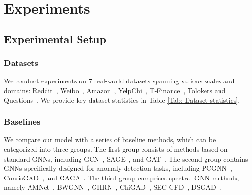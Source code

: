 \section{Experiments}

\subsection{Experimental Setup}
\subsubsection{Datasets}
We conduct experiments on 7 real-world datasets spanning various scales and domains: Reddit~\citep{RedWei}, Weibo~\citep{RedWei}, Amazon~\citep{Amazon}, YelpChi~\citep{YelpChi}, T-Finance~\citep{BWGNN}, Tolokers and Questions~\citep{TolQue}. 
We provide key dataset statistics in Table \ref{Tab: Dataset statistics}.
\begin{table}[t]
    \begin{center}
    {\caption{Key details of seven evaluation datasets }\label{Tab: Dataset statistics}}
    \end{center}
\end{table}
\subsubsection{Baselines}
We compare our model with a series of baseline methods, which can be categorized into three groups.
The first group consists of methods based on standard GNNs, including GCN~\citep{GCN}, SAGE~\citep{SAGE}, and GAT~\citep{GAT}. 
The second group contains GNNs specifically designed for anomaly detection tasks, including PCGNN~\citep{PCGNN}, ConsisGAD~\citep{ConsisGAD}, and GAGA~\citep{GAGA}.
The third group comprises spectral GNN methods, namely
AMNet~\citep{AMNet}, BWGNN~\citep{BWGNN}, GHRN~\citep{GHRN}, ChiGAD~\citep{ChiGAD}, SEC-GFD~\citep{SEC-GFD}, DSGAD~\citep{DSGAD}.
